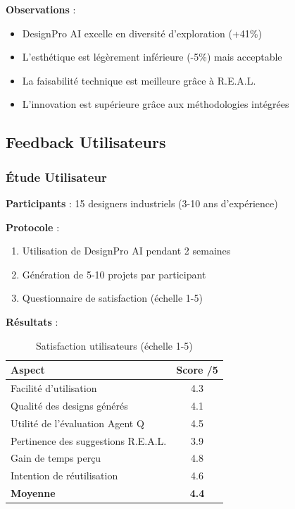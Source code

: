 \textbf{Observations} :
\begin{itemize}[leftmargin=*]
    \item DesignPro AI excelle en diversité d'exploration (+41\%)
    \item L'esthétique est légèrement inférieure (-5\%) mais acceptable
    \item La faisabilité technique est meilleure grâce à R.E.A.L.
    \item L'innovation est supérieure grâce aux méthodologies intégrées
\end{itemize}

\subsection{Feedback Utilisateurs}

\subsubsection{Étude Utilisateur}

\textbf{Participants} : 15 designers industriels (3-10 ans d'expérience)

\textbf{Protocole} :
\begin{enumerate}[leftmargin=*]
    \item Utilisation de DesignPro AI pendant 2 semaines
    \item Génération de 5-10 projets par participant
    \item Questionnaire de satisfaction (échelle 1-5)
\end{enumerate}

\textbf{Résultats} :

\begin{table}[H]
\centering
\caption{Satisfaction utilisateurs (échelle 1-5)}
\label{tab:user_satisfaction}
\begin{tabular}{@{}lc@{}}
\toprule
\textbf{Aspect} & \textbf{Score /5} \\ 
\midrule
Facilité d'utilisation & 4.3 \\
Qualité des designs générés & 4.1 \\
Utilité de l'évaluation Agent Q & 4.5 \\
Pertinence des suggestions R.E.A.L. & 3.9 \\
Gain de temps perçu & 4.8 \\
Intention de réutilisation & 4.6 \\
\midrule
\textbf{Moyenne} & \textbf{4.4} \\
\bottomrule
\end{tabular}
\end{table}

